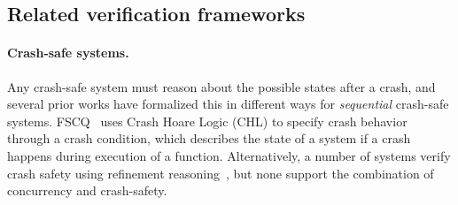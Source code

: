 

\subsection{Related verification frameworks}

\paragraph{Crash-safe systems.}

Any crash-safe system
must reason about the possible states after a crash, and several prior works
have formalized this in different ways for \emph{sequential} crash-safe systems.
FSCQ~\cite{chen:fscq,chen:dfscq} uses Crash Hoare Logic (CHL) to specify crash
behavior through a crash condition, which describes the state of a system if a
crash happens during execution of a function. Alternatively, a number of systems
verify crash safety using refinement
reasoning~\cite{sigurbjarnarson:yggdrasil,ernst:crash-refinement-asms,chajed:argosy,hance:veribetrkv},
but none support the combination of concurrency and crash-safety.



